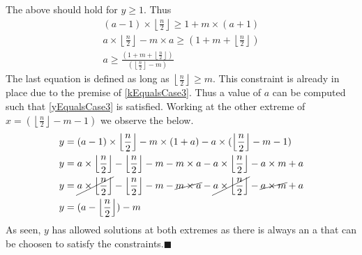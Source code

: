 \documentclass[10pt, twoside]{article}
\newcommand{\floordivision}[2]{\left\lfloor \frac{#1}{#2} \right\rfloor}
\begin{document}
 The above should hold for $y \geq 1$. Thus
 \begin{align*}
 	(a-1)\times \floordivision{n}{2} \geq 1 +  m \times (a+1) \\
 	a\times \floordivision{n}{2} -m\times a \geq (1+m+\floordivision{n}{2}) \\
 	a \geq \frac{(1+m+\floordivision{n}{2})}{(\floordivision{n}{2}-m)}
 \end{align*}
The last equation is defined as long as $\floordivision{n}{2} \ge m$. This constraint is already in place due to the premise of \eqref{kEqualsCase3}. Thus a value of \textbf{$a$} can be computed such that \eqref{yEqualsCase3} is satisfied.\newline
Working at the other extreme of $x = (\floordivision{n}{2} - m -1)$ we observe the below.
\begin{align*}
	y &= (a-1)\times \floordivision{n}{2} -m \times(1+a) -a \times (\floordivision{n}{2} -m -1) \\
	y &= a\times \floordivision{n}{2} - \floordivision{n}{2} -m -m\times a -a \times \floordivision{n}{2} - a\times m + a \\
	y &= \cancel{a\times \floordivision{n}{2}} - \floordivision{n}{2} -m -\cancel{m\times a} -\cancel{a \times \floordivision{n}{2}} - \cancel{a\times m} + a \\
	y &= (a - \floordivision{n}{2}) - m
\end{align*}
As seen, $y$ has allowed solutions at both extremes as there is always an a that can be choosen to satisfy the constraints.$\blacksquare$
\end{document}
